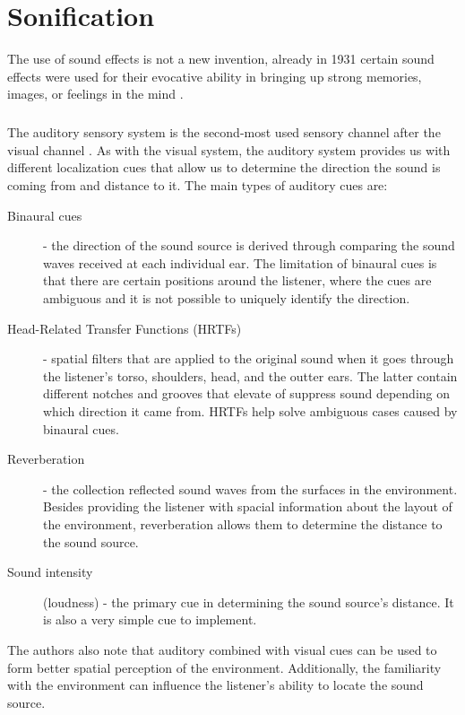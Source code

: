 \chapter{Sonification} %

The use of sound effects is not a new invention, already in 1931 certain sound effects were used for their evocative ability in bringing up strong memories, images, or feelings in the mind \cite{bbc_yearbook_1931}.


\paragraph[Sound properties]{} 
The auditory sensory system is the second-most used sensory channel after the visual channel \cite[p.~46]{jr_3d_2017}. As with the visual system, the auditory system provides us with different localization cues that allow us to determine the direction the sound is coming from and distance to it. The main types of auditory cues are:
\begin{description}
	\item[Binaural cues] - the direction of the sound source is derived through comparing the sound waves received at each individual ear. The limitation of binaural cues is that there are certain positions around the listener, where the cues are ambiguous and it is not possible to uniquely identify the direction.
	\item[Head-Related Transfer Functions (HRTFs)] - spatial filters that are applied to the original sound when it goes through the listener's torso, shoulders, head, and the outter ears. The latter contain different notches and grooves that elevate of suppress sound depending on which direction it came from. HRTFs help solve ambiguous cases caused by binaural cues.
	\item[Reverberation] - the collection reflected sound waves from the surfaces in the environment. Besides providing the listener with spacial information about the layout of the environment, reverberation allows them to determine the distance to the sound source.
	\item[Sound intensity] (loudness) - the primary cue in determining the sound source's distance. It is also a very simple cue to implement.
\end{description}
The authors also note that auditory combined with visual cues can be used to form better spatial perception of the environment. Additionally, the familiarity with the environment can influence the listener's ability to locate the sound source.

